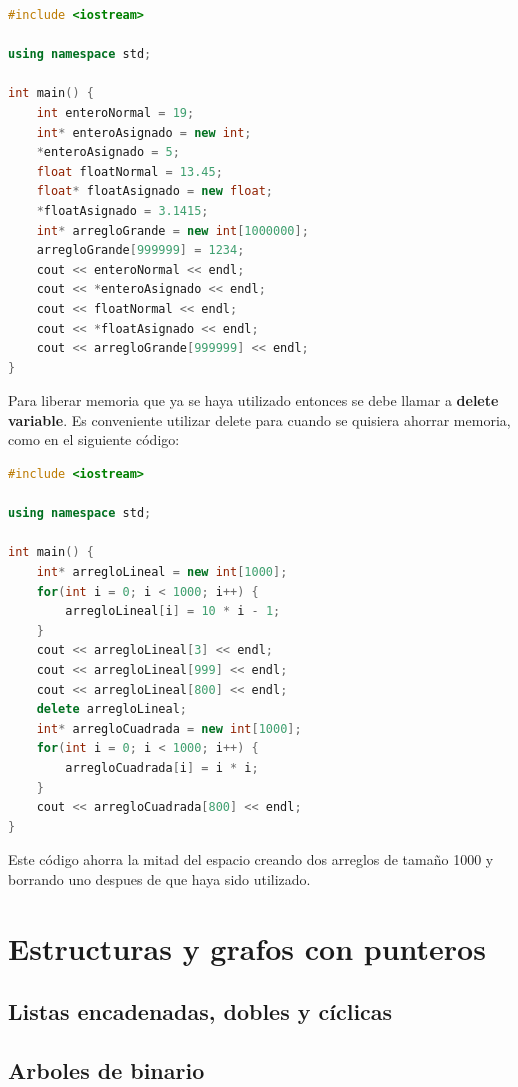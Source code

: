 \documentclass{article}
\begin{document}
\begin{lstlisting}[language=C++, caption=Asignando variables]
#include <iostream>

using namespace std;

int main() {
    int enteroNormal = 19;
    int* enteroAsignado = new int;
    *enteroAsignado = 5;
    float floatNormal = 13.45;
    float* floatAsignado = new float;
    *floatAsignado = 3.1415;
    int* arregloGrande = new int[1000000];
    arregloGrande[999999] = 1234;
    cout << enteroNormal << endl;
    cout << *enteroAsignado << endl;
    cout << floatNormal << endl;
    cout << *floatAsignado << endl;
    cout << arregloGrande[999999] << endl;
}    
\end{lstlisting}

Para liberar memoria que ya se haya utilizado entonces se debe llamar a \textbf{delete variable}. Es conveniente utilizar delete para cuando se quisiera ahorrar memoria, como en el siguiente código:

\begin{lstlisting}[language=C++, caption=Borrando datos]
#include <iostream>

using namespace std;

int main() {
    int* arregloLineal = new int[1000];
    for(int i = 0; i < 1000; i++) {
        arregloLineal[i] = 10 * i - 1;
    }
    cout << arregloLineal[3] << endl;
    cout << arregloLineal[999] << endl;
    cout << arregloLineal[800] << endl;
    delete arregloLineal;
    int* arregloCuadrada = new int[1000];
    for(int i = 0; i < 1000; i++) {
        arregloCuadrada[i] = i * i;
    }
    cout << arregloCuadrada[800] << endl;
}     
\end{lstlisting}

Este código ahorra la mitad del espacio creando dos arreglos de tamaño 1000 y borrando uno despues de que haya sido utilizado.

\section{Estructuras y grafos con punteros}

\subsection{Listas encadenadas, dobles y cíclicas}

\subsection{Arboles de binario}
\end{document}
